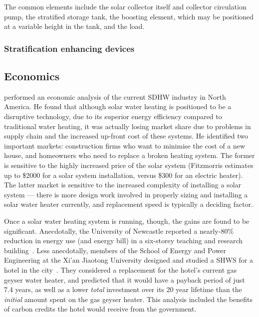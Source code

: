The common elements include the solar collector itself and collector circulation pump, the stratified storage tank, the boosting element, which may be positioned at a variable height in the tank, and the load.

\subsubsection{Stratification enhancing devices}
\label{sec:background:stratifiers}

\subsection{Economics}

\textcite{Fitzmorris10} performed an economic analysis of the current SDHW industry in North America.
He found that although solar water heating is positioned to be a disruptive technology, due to its superior energy efficiency compared to traditional water heating, it was actually losing market share due to problems in supply chain and the increased up-front cost of these systems.
He identified two important markets: construction firms who want to minimise the cost of a new house, and homeowners who need to replace a broken heating system.
The former is sensitive to the highly increased price of the solar system (Fitzmorris estimates up to \$2000 for a solar system installation, versus \$300 for an electric heater).
The latter market is sensitive to the increased complexity of installing a solar system --- there is more design work involved in properly sizing and installing a solar water heater currently, and replacement speed is typically a deciding factor.

Once a solar water heating system is running, though, the gains are found to be significant.
Anecdotally, the University of Newcastle reported a nearly-80\% reduction in energy use (and energy bill) in a six-storey teaching and research building~\cite{ApricusNewcastle}.
Less anecdotally, members of the School of Energy and Power Engineering at the Xi'an Jiaotong University designed and studied a SHWS for a hotel in the city~\cite{Cao14}.
They considered a replacement for the hotel's current gas geyser water heater, and predicted that it would have a payback period of just 7.4 years, as well as a lower \emph{total} investment over its 20 year lifetime than the \emph{initial} amount spent on the gas geyser heater.
This analysis included the benefits of carbon credits the hotel would receive from the government.

